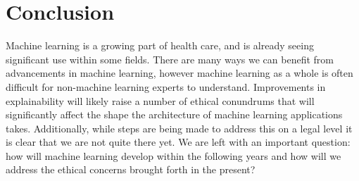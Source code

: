 \documentclass[]{article}
\begin{document}


	\section{Conclusion}
		Machine learning is a growing part of health care, and is already seeing significant use within some fields.\cite{Shameer1156} There are many ways we can benefit from advancements in machine learning, however machine learning as a whole is often difficult for non-machine learning experts to understand.\cite{10.1145/2858036.2858529} Improvements in explainability will likely raise a number of ethical conundrums that will significantly affect the shape the architecture of machine learning applications takes. Additionally, while steps are being made to address this on a legal level\cite{goodman2017european} it is clear that we are not quite there yet.\cite{wachter2017right} We are left with an important question: how will machine learning develop within the following years and how will we address the ethical concerns brought forth in the present?

			
\medskip



		
\end{document}
